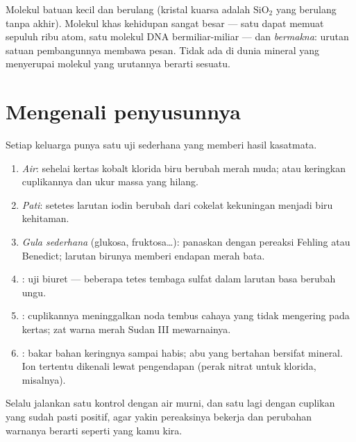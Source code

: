 \begin{remark}\label{rem:g10:chemistry-of-life:macromolecules}
Molekul batuan kecil dan berulang (kristal kuarsa adalah
$\mathrm{SiO_2}$ yang berulang tanpa akhir). Molekul khas
kehidupan sangat besar --- satu  dapat memuat sepuluh ribu atom, satu
molekul DNA bermiliar-miliar --- dan \emph{bermakna}: urutan satuan
pembangunnya membawa pesan. Tidak ada di dunia mineral yang menyerupai
molekul yang urutannya berarti sesuatu.
\end{remark}

\section{Mengenali penyusunnya}

\begin{method}\label{met:g10:chemistry-of-life:tests}
Setiap keluarga punya satu uji sederhana yang memberi hasil kasatmata.
\begin{enumerate}
  \item \emph{Air}: sehelai kertas kobalt klorida biru berubah merah
        muda; atau keringkan cuplikannya dan ukur massa yang hilang.
  \item \emph{Pati}: setetes larutan iodin berubah dari cokelat
        kekuningan menjadi biru kehitaman.
  \item \emph{Gula sederhana} (glukosa, fruktosa\dots): panaskan
        dengan pereaksi Fehling atau Benedict; larutan birunya memberi
        endapan merah bata.
  \item \emph{}: uji biuret --- beberapa tetes tembaga
        sulfat dalam larutan basa berubah ungu.
  \item \emph{}: cuplikannya meninggalkan noda tembus cahaya yang
        tidak mengering pada kertas; zat warna merah Sudan III mewarnainya.
  \item \emph{}: bakar bahan keringnya sampai habis; abu
        yang bertahan bersifat mineral. Ion tertentu dikenali lewat
        pengendapan (perak nitrat untuk klorida, misalnya).
\end{enumerate}
Selalu jalankan satu kontrol dengan air murni, dan satu lagi dengan
cuplikan yang sudah pasti positif, agar yakin pereaksinya bekerja dan
perubahan warnanya berarti seperti yang kamu kira.
\end{method}

